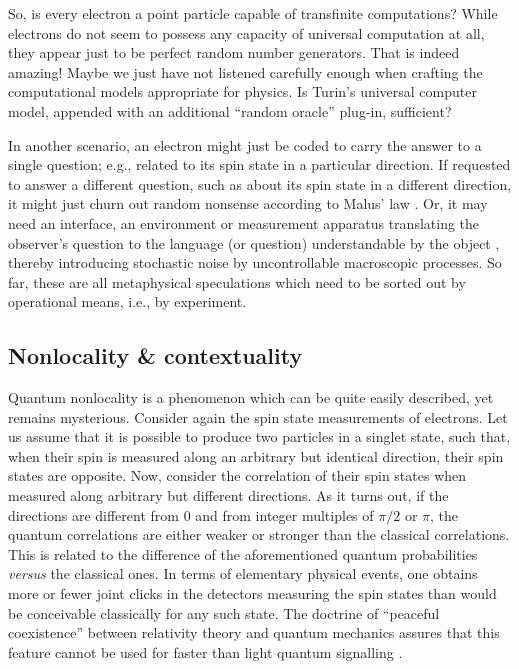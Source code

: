 \documentclass[pre,preprint,showpacs,showkeys,amsfonts]{revtex4}
\begin{document}
So, is every electron a point particle capable of transfinite computations?
While electrons do not seem to possess any capacity of universal computation at all,
they appear just to be perfect random number generators.
That is indeed amazing!
Maybe we just have not listened carefully enough when crafting the
computational models appropriate for physics.
Is Turin's universal computer model, appended with an additional
``random oracle'' plug-in, sufficient?

In another scenario, an electron might just be coded to carry the answer
to a single question; e.g., related to its spin state in a particular
direction. If requested to answer  a different question,
such as about its spin state in a different direction, it might just
churn out random nonsense \cite{zeil-99}
according to Malus' law  \cite{zeil-bruk-99,zeil-bruk-02}.
Or, it may need an interface, an environment or measurement apparatus
translating the observer's question to the language (or question)
understandable by the object \cite{svozil-2000interface,svozil-2002-kyoto},
thereby introducing stochastic noise by uncontrollable macroscopic processes.
So far, these are all metaphysical speculations which need to be sorted out by
operational means, i.e., by experiment.

\subsection{Nonlocality \& contextuality}

Quantum nonlocality is a phenomenon which can be quite easily described,
yet remains mysterious.
Consider again the spin state measurements of electrons. Let us assume that
it is possible to produce  two particles in a singlet state, such that,
when their spin is measured along an arbitrary but identical direction,
their spin states are opposite.
Now, consider the correlation of their spin states when measured along
arbitrary but different directions.
As it turns out, if the directions are different from $0$ and
from integer multiples of
$\pi /2$ or $\pi$, the quantum correlations are either weaker
or stronger than the classical
correlations.
This is related to the difference of the aforementioned quantum probabilities
{\it versus}
the classical ones.
In terms of elementary physical events,
one obtains more or fewer joint clicks in the detectors
measuring the spin states
than would be conceivable classically for any such state.
The doctrine of ``peaceful coexistence'' between relativity theory and quantum mechanics
\cite{shimony2}
assures that this feature cannot be used for
faster than light quantum signalling
\cite{herbert,wo-zu,glauber}.
\end{document}
